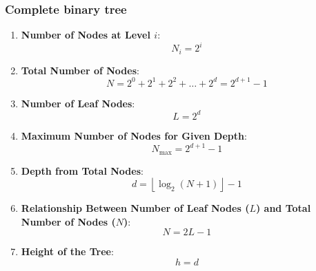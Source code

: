 \documentclass{report}
\begin{document}
    \subsubsection{Complete binary tree}
    \begin{enumerate}
        \item \textbf{Number of Nodes at Level \(i\)}:
            \[N_i = 2^i\]
        \item \textbf{Total Number of Nodes}:
            \[N = 2^0 + 2^1 + 2^2 + \ldots + 2^d = 2^{d+1} - 1\]
        \item \textbf{Number of Leaf Nodes}:
            \[L = 2^d\]
        \item \textbf{Maximum Number of Nodes for Given Depth}:
            \[N_{\text{max}} = 2^{d+1} - 1\]
        \item \textbf{Depth from Total Nodes}:
            \[d = \left\lfloor \log_2(N+1) \right\rfloor - 1\]
        \item \textbf{Relationship Between Number of Leaf Nodes (\(L\)) and Total Number of Nodes (\(N\))}:
            \[N = 2L - 1\]
        \item \textbf{Height of the Tree}:
            \[h = d\]
    \end{enumerate}

    \bigbreak \noindent 
\end{document}
